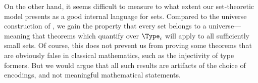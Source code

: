 On the other hand, it seems difficult to measure to what extent our
set-theoretic model presents
\SetoidCC as a good internal language for sets. Compared to the universe
construction of , we gain the property that every set belongs
to a universe---meaning that theorems which quantify over \( \Type_i \)
will apply to all sufficiently small sets.
%
Of course, this does not prevent us from proving some theorems that are
obviously false in classical mathematics, such as the
injectivity of type formers. But we would argue that all such results
are artifacts of the choice of encodings, and not meaningful
mathematical statements.

